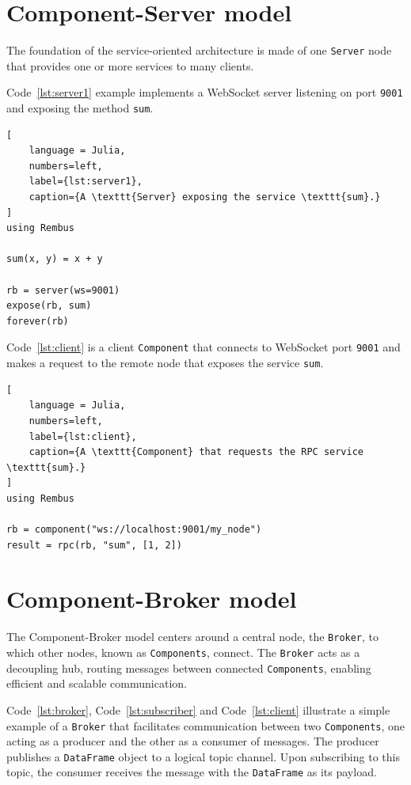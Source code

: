 \documentclass{juliacon}
\begin{document}
\newpage{}

\section{Component-Server model}\label{component-server-model}

The foundation of the service-oriented architecture is made of one \texttt{Server}
node that provides one or more services to many clients.

Code~\ref{lst:server1} example implements a WebSocket server listening on
port \texttt{9001} and exposing the method \texttt{sum}.

\begin{lstlisting}[
    language = Julia, 
    numbers=left, 
    label={lst:server1}, 
    caption={A \texttt{Server} exposing the service \texttt{sum}.}
]
using Rembus

sum(x, y) = x + y

rb = server(ws=9001)
expose(rb, sum)
forever(rb)
\end{lstlisting}

\vskip 6pt

Code~\ref{lst:client} is a client \texttt{Component} that connects to WebSocket
port \texttt{9001} and makes a request to the remote node that exposes the
service \texttt{sum}.

\begin{lstlisting}[
    language = Julia, 
    numbers=left, 
    label={lst:client}, 
    caption={A \texttt{Component} that requests the RPC service \texttt{sum}.}
]
using Rembus

rb = component("ws://localhost:9001/my_node")
result = rpc(rb, "sum", [1, 2])
\end{lstlisting}

\section{Component-Broker model}\label{component-broker-model}

The Component-Broker model centers around a central node, the \texttt{Broker},
to which other nodes, known as \texttt{Components}, connect. The \texttt{Broker}
acts as a decoupling hub, routing messages between connected \texttt{Components},
enabling efficient and scalable communication.
\vskip 6pt

Code~\ref{lst:broker}, Code~\ref{lst:subscriber} and Code~\ref{lst:client} illustrate a
simple example of a \texttt{Broker} that facilitates
communication between two \texttt{Components}, one acting as a producer and the
other as a consumer of messages. The producer publishes a \texttt{DataFrame}
object to a logical topic channel. Upon subscribing to this topic, the consumer
receives the message with the \texttt{DataFrame} as its payload.
\vskip 6pt
\end{document}
